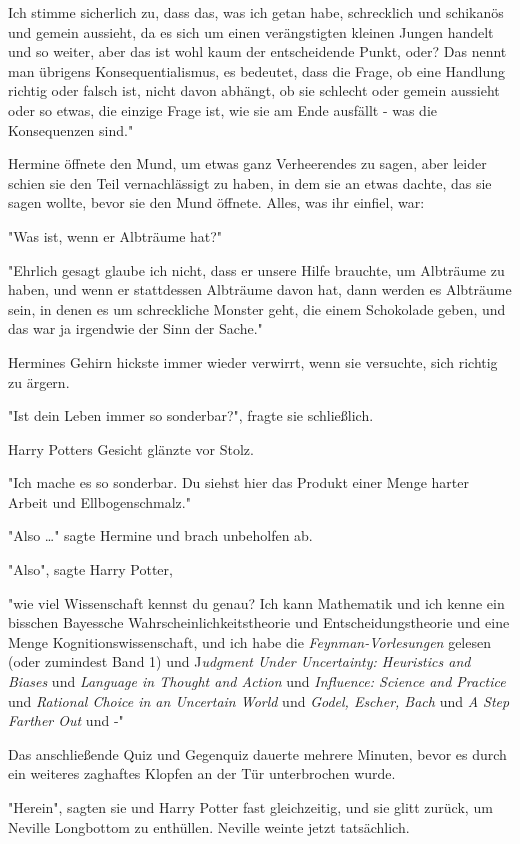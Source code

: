 {Ich stimme sicherlich zu, dass das, was ich getan habe, schrecklich und schikanös und gemein aussieht, da es sich um einen verängstigten kleinen Jungen handelt und so weiter, aber das ist wohl kaum der entscheidende Punkt, oder? Das nennt man übrigens Konsequentialismus, es bedeutet, dass die Frage, ob eine Handlung richtig oder falsch ist, nicht davon abhängt, ob sie schlecht oder gemein aussieht oder so etwas, die einzige Frage ist, wie sie am Ende ausfällt - was die Konsequenzen sind."

Hermine öffnete den Mund, um etwas ganz Verheerendes zu sagen, aber leider schien sie den Teil vernachlässigt zu haben, in dem sie an etwas dachte, das sie sagen wollte, bevor sie den Mund öffnete. Alles, was ihr einfiel, war:

"Was ist, wenn er Albträume hat?"

"Ehrlich gesagt glaube ich nicht, dass er unsere Hilfe brauchte, um Albträume zu haben, und wenn er stattdessen Albträume davon hat, dann werden es Albträume sein, in denen es um schreckliche Monster geht, die einem Schokolade geben, und das war ja irgendwie der Sinn der Sache."

Hermines Gehirn hickste immer wieder verwirrt, wenn sie versuchte, sich richtig zu ärgern.

"Ist dein Leben immer so sonderbar?", fragte sie schließlich.

Harry Potters Gesicht glänzte vor Stolz.

"Ich mache es so sonderbar. Du siehst hier das Produkt einer Menge harter Arbeit und Ellbogenschmalz."

"Also …" sagte Hermine und brach unbeholfen ab.

"Also", sagte Harry Potter,

"wie viel Wissenschaft kennst du genau? Ich kann Mathematik und ich kenne ein bisschen Bayessche Wahrscheinlichkeitstheorie und Entscheidungstheorie und eine Menge Kognitionswissenschaft, und ich habe die \emph{Feynman-Vorlesungen} gelesen (oder zumindest Band 1) und J\emph{udgment Under Uncertainty: Heuristics and Biases} und \emph{Language in Thought and Action} und \emph{Influence: Science and Practice} und \emph{Rational Choice in an Uncertain World} und \emph{Godel, Escher, Bach} und \emph{A Step Farther Out} und -"

Das anschließende Quiz und Gegenquiz dauerte mehrere Minuten, bevor es durch ein weiteres zaghaftes Klopfen an der Tür unterbrochen wurde.

"Herein", sagten sie und Harry Potter fast gleichzeitig, und sie glitt zurück, um Neville Longbottom zu enthüllen. Neville weinte jetzt tatsächlich.

}
